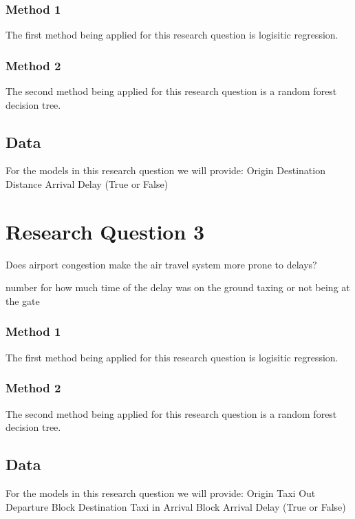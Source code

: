 \documentclass[a4paper,12pt]{article}
\begin{document}
\subsubsection{Method 1}
The first method being applied for this research question is logisitic regression.

\subsubsection{Method 2}
The second method being applied for this research question is a random forest decision tree.

\subsection{Data}
For the models in this research question we will provide:
Origin
Destination
Distance
Arrival Delay (True or False)


\section{Research Question 3}
Does airport congestion make the air travel system more prone to delays?

number for how much time of the delay was on the ground taxing or not being at the gate

\subsubsection{Method 1}
The first method being applied for this research question is logisitic regression.

\subsubsection{Method 2}
The second method being applied for this research question is a random forest decision tree.

\subsection{Data}
For the models in this research question we will provide:
Origin
Taxi Out
Departure Block
Destination
Taxi in
Arrival Block
Arrival Delay (True or False)
\end{document}
